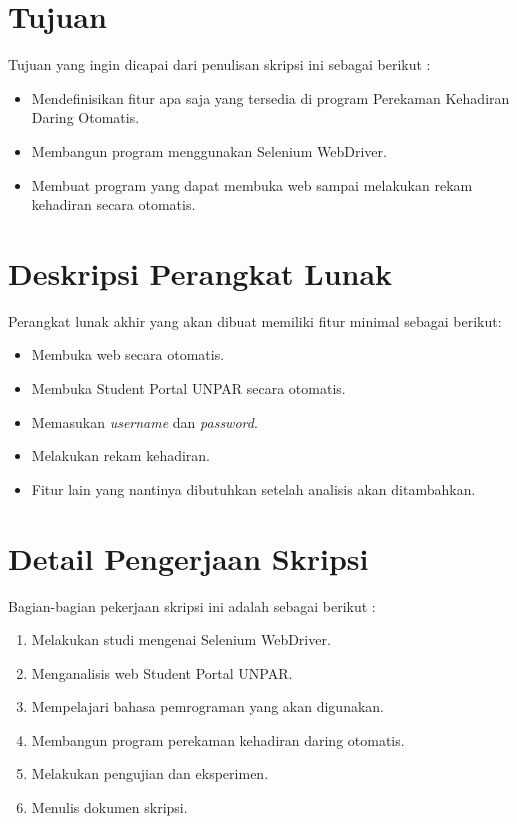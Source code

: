 \documentclass[a4paper,twoside]{article}
\begin{document}
\section{Tujuan}
Tujuan yang ingin dicapai dari penulisan skripsi ini sebagai berikut :
\begin{itemize}
	\item Mendefinisikan fitur apa saja yang tersedia di program Perekaman Kehadiran Daring Otomatis.
	\item Membangun program menggunakan Selenium WebDriver.
	\item Membuat program yang dapat membuka web sampai melakukan rekam kehadiran secara otomatis.
	
\end{itemize}



\section{Deskripsi Perangkat Lunak}
Perangkat lunak akhir yang akan dibuat memiliki fitur minimal sebagai berikut:
\begin{itemize}
	\item Membuka web secara otomatis.
	\item Membuka Student Portal UNPAR secara otomatis.
	\item Memasukan \textit{username} dan \textit{password}.
	\item Melakukan rekam kehadiran.
	\item Fitur lain yang nantinya dibutuhkan setelah analisis akan ditambahkan. 
\end{itemize}

\section{Detail Pengerjaan Skripsi}
Bagian-bagian pekerjaan skripsi ini adalah sebagai berikut :
	\begin{enumerate}
		\item Melakukan studi mengenai Selenium WebDriver.
		\item Menganalisis web Student Portal UNPAR.
		\item Mempelajari bahasa pemrograman yang akan digunakan.
		\item Membangun program perekaman kehadiran daring otomatis.
		\item Melakukan pengujian dan eksperimen.
		\item Menulis dokumen skripsi.		

	\end{enumerate}
\end{document}
